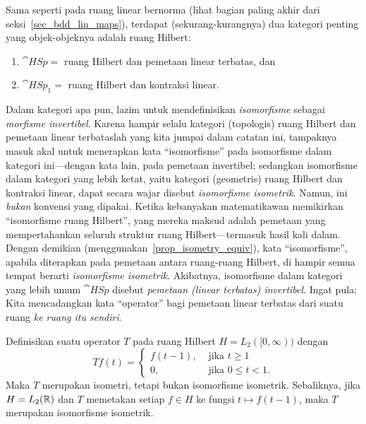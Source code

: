 Sama seperti pada ruang linear bernorma (lihat bagian paling akhir dari seksi~\ref{sec_bdd_lin_maps}),
terdapat (sekurang-kurangnya) dua kategori penting yang objek-objeknya adalah ruang Hilbert:
 \begin{enumerate}
  \item[(a)] $\cat{HSp} =$ ruang Hilbert dan pemetaan linear terbatas, dan
  \item[(b)] $\cat{HSp_1} =$ ruang Hilbert dan kontraksi linear.
 \end{enumerate}
Dalam kategori apa pun, lazim untuk mendefinisikan \emph{isomorfisme} sebagai \emph{morfisme invertibel}. Karena hampir selalu
kategori (topologis) ruang Hilbert dan pemetaan linear terbataslah yang kita jumpai
dalam catatan ini, tampaknya masuk akal untuk menerapkan kata ``isomorfisme'' pada
isomorfisme dalam kategori ini---dengan kata lain, pada pemetaan invertibel; sedangkan isomorfisme
dalam kategori yang lebih ketat, yaitu
kategori (geometris) ruang Hilbert dan kontraksi linear, dapat secara wajar
disebut \emph{isomorfisme isometrik}. Namun, ini \emph{bukan} konvensi yang dipakai. Ketika kebanyakan matematikawan memikirkan
``isomorfisme ruang Hilbert'', yang mereka maksud adalah pemetaan yang mempertahankan seluruh struktur ruang Hilbert---termasuk
hasil kali dalam. Dengan demikian (menggunakan~\ref{prop_isometry_equiv}), kata
``isomorfisme'', apabila diterapkan pada pemetaan antara ruang-ruang Hilbert, di hampir semua tempat berarti \emph{isomorfisme isometrik}.
Akibatnya, isomorfisme dalam kategori yang lebih umum $\cat{HSp}$ disebut \emph{pemetaan (linear terbatas) invertibel}.
Ingat pula: Kita mencadangkan kata
``operator'' bagi pemetaan linear terbatas dari suatu ruang \emph{ke ruang itu sendiri}.

\begin{exam} Definisikan suatu operator $T$ pada ruang Hilbert $H = L_2([0,\infty))$ dengan
   \[ Tf(t) = \begin{cases}   f(t-1),  &\text{ jika $t \ge 1$} \\
                                   0,  &\text{ jika $0 \le t < 1$.}
           \end{cases} \]
Maka $T$ merupakan isometri, tetapi bukan isomorfisme isometrik. Sebaliknya, jika
$H = L_2(\mathbb{R})$ dan $T$ memetakan setiap $f \in H$ ke fungsi $t \mapsto f(t-1)$, maka $T$ merupakan isomorfisme isometrik.
\end{exam}

